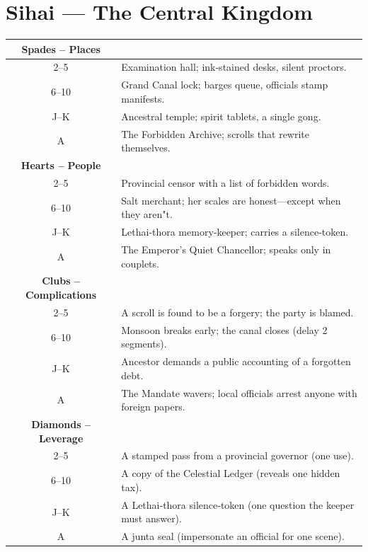 \documentclass[12pt]{book}
\begin{document}
\section{Sihai --- The Central Kingdom}
\begin{longtable}{c X}
\toprule
\textbf{Spades -- Places} & \\
\midrule
2--5   & Examination hall; ink‑stained desks, silent proctors. \\
6--10 & Grand Canal lock; barges queue, officials stamp manifests. \\
J--K  & Ancestral temple; spirit tablets, a single gong. \\
A    & The Forbidden Archive; scrolls that rewrite themselves. \\
\midrule
\textbf{Hearts -- People} & \\
\midrule
2--5   & Provincial censor with a list of forbidden words. \\
6--10 & Salt merchant; her scales are honest---except when they aren"t. \\
J--K  & Lethai‑thora memory‑keeper; carries a silence‑token. \\
A    & The Emperor's Quiet Chancellor; speaks only in couplets. \\
\midrule
\textbf{Clubs -- Complications} & \\
\midrule
2--5   & A scroll is found to be a forgery; the party is blamed. \\
6--10 & Monsoon breaks early; the canal closes (delay 2 segments). \\
J--K  & Ancestor demands a public accounting of a forgotten debt. \\
A    & The Mandate wavers; local officials arrest anyone with foreign papers. \\
\midrule
\textbf{Diamonds -- Leverage} & \\
\midrule
2--5   & A stamped pass from a provincial governor (one use). \\
6--10 & A copy of the Celestial Ledger (reveals one hidden tax). \\
J--K  & A Lethai‑thora silence‑token (one question the keeper must answer). \\
A    & A junta seal (impersonate an official for one scene). \\
\bottomrule
\end{longtable}
\end{document}
